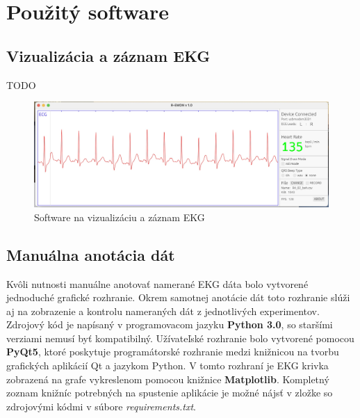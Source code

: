 \section{Použitý software}

\subsection{Vizualizácia a záznam EKG}

TODO

\begin{figure}[H]
    \centering
    \includegraphics[scale=0.18]{img/ok.jpeg}
    \caption{Software na vizualizáciu a záznam EKG}
    \label{fig:SW_ok}
\end{figure}

\subsection{Manuálna anotácia dát}

Kvôli nutnosti manuálne anotovať namerané EKG dáta bolo vytvorené jednoduché grafické rozhranie. Okrem samotnej anotácie dát toto rozhranie slúži aj na zobrazenie a kontrolu nameraných dát z jednotlivých experimentov. Zdrojový kód je napísaný v programovacom jazyku \textbf{Python 3.0}, so staršími verziami nemusí byť kompatibilný. Užívateľské rozhranie bolo vytvorené pomocou \textbf{PyQt5}, ktoré poskytuje programátorské rozhranie medzi knižnicou na tvorbu grafických aplikácií Qt a jazykom Python. V tomto rozhraní je EKG krivka zobrazená na grafe vykreslenom pomocou knižnice \textbf{Matplotlib}. Kompletný zoznam knižníc potrebných na spustenie aplikácie je možné nájsť v zložke so zdrojovými kódmi v súbore \textit{requirements.txt}.

